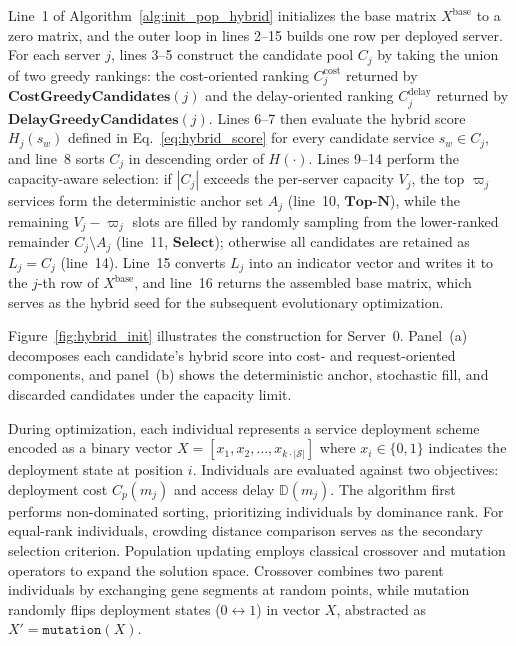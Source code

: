 \documentclass[10pt, conference, letterpaper]{IEEEtran}
\newenvironment{revision}{\begingroup\color{blue}}{\endgroup}
\newenvironment{revision}{\begingroup}{\endgroup}
\begin{document}
Line~1 of Algorithm~\ref{alg:init_pop_hybrid} initializes the base matrix $X^{\mathrm{base}}$ to a zero
  matrix, and the outer loop in lines 2--15 builds one row per deployed server. For each server $j$, lines 3--5
  construct the candidate pool $C_j$ by taking the union of two greedy rankings: the cost-oriented ranking
  $C_j^{\mathrm{cost}}$ returned by $\textbf{CostGreedyCandidates}(j)$ and the delay-oriented ranking
  $C_j^{\mathrm{delay}}$ returned by $\textbf{DelayGreedyCandidates}(j)$. Lines 6--7 then evaluate the hybrid
  score $H_j(s_w)$ defined in Eq.~\eqref{eq:hybrid_score} for every candidate service $s_w \in C_j$, and line~8
  sorts $C_j$ in descending order of $H(\cdot)$. Lines 9--14 perform the capacity-aware selection: if $|C_j|$
  exceeds the per-server capacity $V_j$, the top $\varpi_j$ services form the deterministic anchor set $A_j$
  (line~10, $\textbf{Top-N}$), while the remaining $V_j - \varpi_j$ slots are filled by randomly sampling from
  the lower-ranked remainder $C_j \setminus A_j$ (line~11, $\textbf{Select}$); otherwise all candidates are
  retained as $L_j = C_j$ (line~14). Line~15 converts $L_j$ into an indicator vector and writes it to the $j$-th
   row of $X^{\mathrm{base}}$, and line~16 returns the assembled base matrix, which serves as the hybrid seed
  for the subsequent evolutionary optimization.

\begin{revision}
Figure~\ref{fig:hybrid_init} illustrates the construction for Server~0. Panel~(a) decomposes each candidate's hybrid score into cost- and request-oriented components, and panel~(b) shows the deterministic anchor, stochastic fill, and discarded candidates under the capacity limit.
\end{revision}

During optimization, each individual represents a service deployment scheme encoded as a binary vector $X = [x_1, x_2, \dots, x_{k \cdot |\mathcal{S}|}]$ where $x_i \in \{0,1\}$ indicates the deployment state at position $i$. Individuals are evaluated against two objectives: deployment cost $C_p(m_j)$ and access delay $\mathbb{D}(m_j)$. The algorithm first performs non-dominated sorting, prioritizing individuals by dominance rank. For equal-rank individuals, crowding distance comparison serves as the secondary selection criterion. Population updating employs classical crossover and mutation operators to expand the solution space. Crossover combines two parent individuals by exchanging gene segments at random points, while mutation randomly flips deployment states ($0 \leftrightarrow 1$) in vector $X$, abstracted as $X'= \texttt{mutation} (X)$. 
\end{document}
